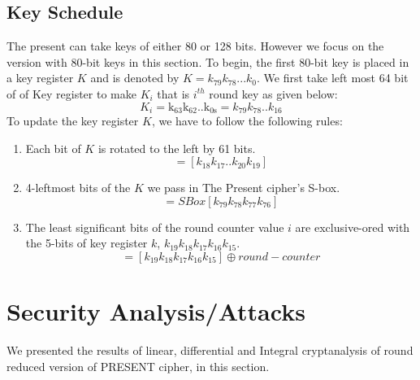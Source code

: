 \documentclass[journal=tosc,preprint]{iacrtrans}
\begin{document}
\subsection{Key Schedule}
The present can take keys of either 80 or 128 bits. However
we focus on the version with 80-bit keys in this section.
 To begin, the first 80-bit key is placed in a key register $K$ and is denoted by $K = k_{79}k_{78}$...$k_0$. We first take left most 64 bit of of Key register to make $K_i$ that is $i^{th}$ round key as given below:
\begin{equation*}
K_i = \mathrm{k_{63}}\mathrm{k_{62}}..\mathrm{k_{0s}} = k_{79}k_{78}..k_{16}
\end{equation*}
To update the key register $K$, we have to follow the following rules:
\begin{enumerate}
	\item  Each bit of $K$ is rotated to the left by 61 bits. 
	\begin{equation*}
	[k_{79}k_{78}..k_{0}] = [k_{18}k_{17}..k_{20}k_{19}]
	\end{equation*}
	\item 4-leftmost bits of the $K$ we pass in The Present cipher's S-box.
	\begin{equation*}
	[k_{79}k_{78}k_{77}k_{76}] = SBox[k_{79}k_{78}k_{77}k_{76}]
	\end{equation*}
	\item The least significant bits of the round counter value $i$ are exclusive-ored with the 5-bits of key register  $k$, $k_{19}k_{18}k_{17}k_{16}k_{15}$. 
	\begin{equation*}
	[k_{19}k_{18}k_{17}k_{16}k_{15}] = [k_{19}k_{18}k_{17}k_{16}k_{15}] \oplus round-counter
	\end{equation*}
\end{enumerate}
\section{Security Analysis/Attacks}
We presented the results of linear, differential and Integral cryptanalysis of round reduced version of PRESENT cipher, in this section.
\end{document}
